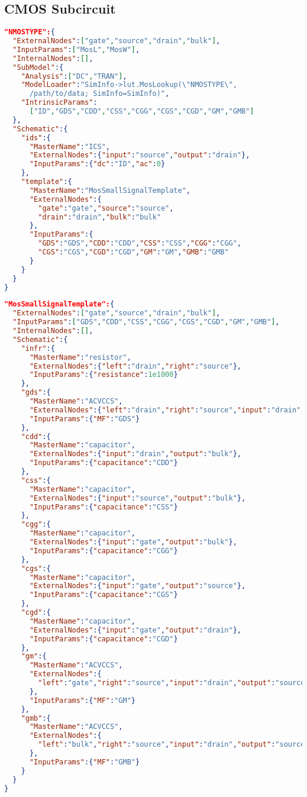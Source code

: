 \subsection{CMOS Subcircuit}\label{appendix:mos-subckt}
\begin{lstlisting}[language=json,numbers=none,
caption={CMOS subcircuit},label=lst:mos-subckt]
"NMOSTYPE":{
  "ExternalNodes":["gate","source","drain","bulk"],
  "InputParams":["MosL","MosW"],
  "InternalNodes":[],
  "SubModel":{
    "Analysis":["DC","TRAN"],
    "ModelLoader":"SimInfo->lut.MosLookup(\"NMOSTYPE\",
      /path/to/data; SimInfo=SimInfo)",
    "IntrinsicParams":
      ["ID","GDS","CDD","CSS","CGG","CGS","CGD","GM","GMB"]
  },
  "Schematic":{
    "ids":{
      "MasterName":"ICS",
      "ExternalNodes":{"input":"source","output":"drain"},
      "InputParams":{"dc":"ID","ac":0}
    },
    "template":{
      "MasterName":"MosSmallSignalTemplate",
      "ExternalNodes":{
        "gate":"gate","source":"source",
        "drain":"drain","bulk":"bulk"
      },
      "InputParams":{
        "GDS":"GDS","CDD":"CDD","CSS":"CSS","CGG":"CGG",
        "CGS":"CGS","CGD":"CGD","GM":"GM","GMB":"GMB"
      }
    }
  }
}
\end{lstlisting}
\begin{lstlisting}[language=json,numbers=none,
caption={MosSmallSignalTemplate: Small signal equivalent circuit decomposition},label=lst:mos-small-signal-subckt]
"MosSmallSignalTemplate":{
  "ExternalNodes":["gate","source","drain","bulk"],
  "InputParams":["GDS","CDD","CSS","CGG","CGS","CGD","GM","GMB"],
  "InternalNodes":[],
  "Schematic":{
    "infr":{
      "MasterName":"resistor",
      "ExternalNodes":{"left":"drain","right":"source"},
      "InputParams":{"resistance":1e1000}
    },
    "gds":{
      "MasterName":"ACVCCS",
      "ExternalNodes":{"left":"drain","right":"source","input":"drain","output":"source"},
      "InputParams":{"MF":"GDS"}
    },
    "cdd":{
      "MasterName":"capacitor",
      "ExternalNodes":{"input":"drain","output":"bulk"},
      "InputParams":{"capacitance":"CDD"}
    },
    "css":{
      "MasterName":"capacitor",
      "ExternalNodes":{"input":"source","output":"bulk"},
      "InputParams":{"capacitance":"CSS"}
    },
    "cgg":{
      "MasterName":"capacitor",
      "ExternalNodes":{"input":"gate","output":"bulk"},
      "InputParams":{"capacitance":"CGG"}
    },
    "cgs":{
      "MasterName":"capacitor",
      "ExternalNodes":{"input":"gate","output":"source"},
      "InputParams":{"capacitance":"CGS"}
    },
    "cgd":{
      "MasterName":"capacitor",
      "ExternalNodes":{"input":"gate","output":"drain"},
      "InputParams":{"capacitance":"CGD"}
    },
    "gm":{
      "MasterName":"ACVCCS",
      "ExternalNodes":{
        "left":"gate","right":"source","input":"drain","output":"source"
      },
      "InputParams":{"MF":"GM"}
    },
    "gmb":{
      "MasterName":"ACVCCS",
      "ExternalNodes":{
        "left":"bulk","right":"source","input":"drain","output":"source"
      },
      "InputParams":{"MF":"GMB"}
    }
  }
}
\end{lstlisting}

